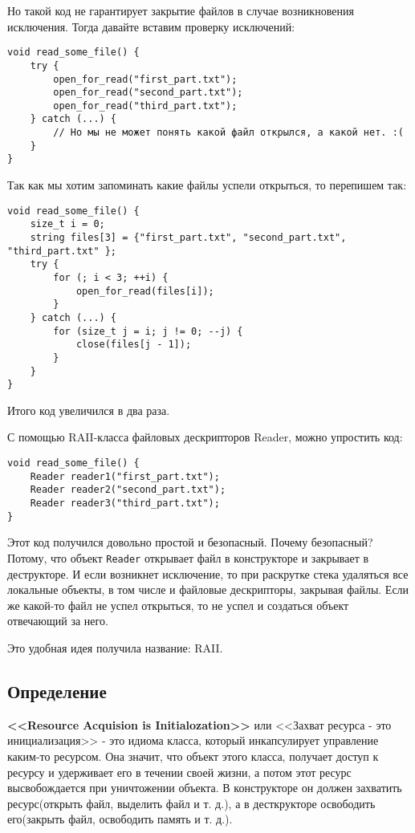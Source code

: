 Но такой код не гарантирует закрытие файлов в случае возникновения исключения.
Тогда давайте вставим проверку исключений:
\begin{verbatim}
void read_some_file() {
    try {
        open_for_read("first_part.txt");
        open_for_read("second_part.txt");
        open_for_read("third_part.txt");
    } catch (...) {
        // Но мы не может понять какой файл открылся, а какой нет. :(
    }
}
\end{verbatim}

Так как мы хотим запоминать какие файлы успели открыться, то перепишем так:

\begin{verbatim}
void read_some_file() {
    size_t i = 0;
    string files[3] = {"first_part.txt", "second_part.txt", "third_part.txt" };
    try {
        for (; i < 3; ++i) {
            open_for_read(files[i]);
        }
    } catch (...) {
        for (size_t j = i; j != 0; --j) {
            close(files[j - 1]);
        }
    }
}
\end{verbatim}

Итого код увеличился в два раза.

С помощью RAII-класса файловых дескрипторов Reader, можно упростить код:

\begin{verbatim}
void read_some_file() {
    Reader reader1("first_part.txt");
    Reader reader2("second_part.txt");
    Reader reader3("third_part.txt");
}
\end{verbatim}

Этот код получился довольно простой и безопасный. Почему безопасный? Потому, что объект \texttt{Reader} открывает файл в конструкторе и закрывает в деструкторе. И если возникнет исключение, то при раскрутке стека удаляться все локальные объекты, в том числе и файловые дескрипторы, закрывая файлы. Если же какой-то файл не успел открыться, то не успел и создаться объект отвечающий за него.

Это удобная идея получила название: RAII.

\subsection{Определение}

\textbf{<<Resource Acquision is Initialozation>>} или <<Захват ресурса - это инициализация>> - это идиома класса, который инкапсулирует управление каким-то ресурсом. Она значит, что объект этого класса, получает доступ к ресурсу и удерживает его в течении своей жизни, а потом этот ресурс высвобождается при уничтожении объекта.
В конструкторе он должен захватить ресурс(открыть файл, выделить файл и т. д.), а в десткрукторе освободить его(закрыть файл, освободить память и т. д.).

